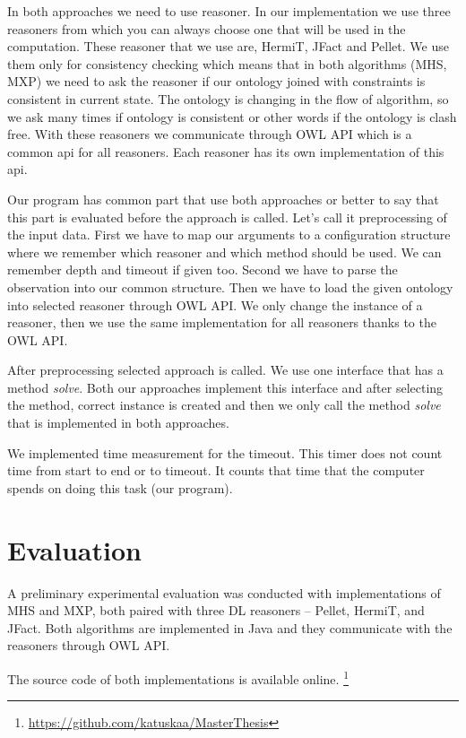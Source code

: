 \documentclass[12pt,a4paper]{article}
\begin{document}
In both approaches we need to use reasoner. In our implementation we use three reasoners from which you can always choose one that will be used in the computation. These reasoner that we use are, HermiT, JFact and Pellet. We use them only for consistency checking which means that in both algorithms (MHS, MXP) we need to ask the reasoner if our ontology joined with constraints is consistent in current state. The ontology is changing in the flow of algorithm, so we ask many times if ontology is consistent or other words if the ontology is clash free. With these reasoners we communicate through OWL API which is a common api for all reasoners. Each reasoner has its own implementation of this api.

Our program has common part that use both approaches or better to say that this part is evaluated before the approach is called. Let's call it preprocessing of the input data. First we have to map our arguments to a configuration structure where we remember which reasoner and which method should be used. We can remember depth and timeout if given too. Second we have to parse the observation into our common structure. Then we have to load the given ontology into selected reasoner through OWL API. We only change the instance of a reasoner, then we use the same implementation for all reasoners thanks to the OWL API.

After preprocessing selected approach is called. We use one interface that has a method \textit{solve}. Both our approaches implement this interface and after selecting the method, correct instance is created and then we only call the method \textit{solve} that is implemented in both approaches.

We implemented time measurement for the timeout. This timer does not count time from start to end or to timeout. It counts that time that the computer spends on doing this task (our program).

\pagebreak
\section{Evaluation}

A preliminary experimental evaluation was conducted with implementations of
MHS and MXP, both paired with three  DL reasoners -- Pellet, HermiT, and
JFact. Both algorithms are implemented in Java and they communicate with the
reasoners through OWL API.

The source code of both implementations is available online.
\footnote{\url{https://github.com/katuskaa/MasterThesis}}
\end{document}

